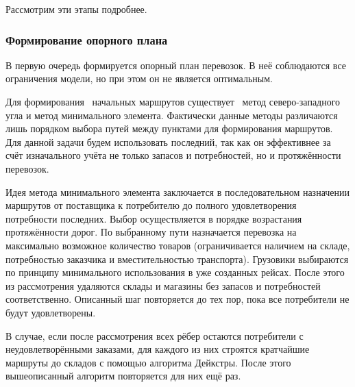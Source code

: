 	Рассмотрим эти этапы подробнее.
	
	\subsubsection{Формирование опорного плана}
	В первую очередь формируется опорный план перевозок. В неё соблюдаются все ограничения модели, но при этом он не является оптимальным.
	
	Для формирования \, начальных маршрутов существует \, метод северо-западного угла и метод минимального элемента\cite{trans:comporation}. Фактически данные методы различаются лишь порядком выбора путей между пунктами для формирования маршрутов. Для данной задачи будем использовать последний, так как он эффективнее \cite{potential:polyindex} за счёт изначального учёта не только запасов и потребностей, но и протяжённости перевозок.
	
	Идея метода минимального элемента заключается в последовательном назначении маршрутов от поставщика к потребителю до полного удовлетворения потребности последних. Выбор осуществляется в порядке возрастания протяжённости дорог. По выбранному пути назначается перевозка на максимально возможное количество товаров (ограничивается наличием на складе, потребностью заказчика и вместительностью транспорта). Грузовики выбираются по принципу минимального использования в уже созданных рейсах. После этого из рассмотрения удаляются склады и магазины без запасов и потребностей соответственно. Описанный шаг повторяется до тех пор, пока все потребители не будут удовлетворены.
	
	В случае, если после рассмотрения всех рёбер остаются потребители с неудовлетворёнными заказами, для каждого из них строятся кратчайшие маршруты до складов с помощью алгоритма Дейкстры\cite{alg:Corman}. После этого вышеописанный алгоритм повторяется для них ещё раз.
	
